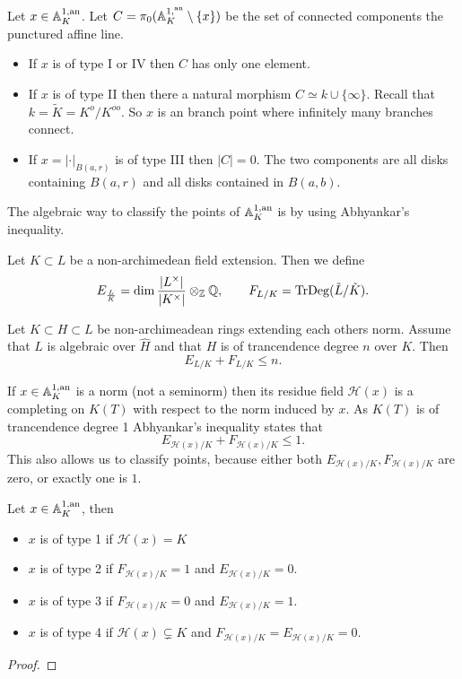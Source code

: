 \begin{proposition}
	Let $x \in \mathbb{A}_K^{1,\text{an}}$. 
	Let $C = \pi_0(\mathbb{A}_K^{1, {}^{\text{an}}}\setminus \{ x\} )$ be the set of connected components the punctured affine line. 
	\begin{itemize}
		\item If $x$ is of type I  or IV then $C$ has only one element.
		\item If $x$ is of type II then there a natural morphism $C \simeq k \cup \{\infty\} $. Recall that $k = \tilde K = K^{o} / K^{oo} $. 
			So $x$ is an branch point where infinitely many branches connect. 
		\item If $x = |\cdot |_{B(a, r)}$ is of type III then $|C| = 0$. The two components are all disks containing $B(a, r)$ and all disks contained in $B(a, b)$. 
	\end{itemize}
\end{proposition}
The algebraic way to classify the points of $\mathbb{A}_K^{1,\text{an}}$ is by using Abhyankar's inequality. 
\begin{definition}
	Let $K \subset L$ be a non-archimedean field extension. 
	Then we define \[
		E_{\frac{L}{ K}} = \dim \frac{|L^{\times }|}{|K^{\times }|} \otimes_{\mathbb{Z}} \mathbb{Q}, \qquad F_{L / K} = \operatorname{TrDeg}(\tilde L / \tilde K)
	.\] 
\end{definition}

\begin{theorem}
	Let $K \subset H \subset L$ be non-archimeadean rings extending each others norm. Assume that $L$ is algebraic over $\hat{H}$ and that $H$ is of trancendence degree $n$ over $K$. Then \[
	E_{L / K} + F_{L / K}  \le n
	.\] 
\end{theorem}

If $x \in \mathbb{A}_K^{1, \text{an}}$ is a norm (not a seminorm) then its residue field $\mathcal{H} (x)$ is a completing on $K(T)$ with respect to the norm induced by $x$. As $K(T)$ is of trancendence degree 1 Abhyankar's inequality states that \[
	E_{\mathcal{H} (x) / K} + F_{\mathcal{H} (x) / K} \le 1
.\] 
This also allows us to classify points, because either both $E_{\mathcal{H} (x) / K}, F_{\mathcal{H} (x) / K}$ are zero, or exactly one is $1$. 
\begin{proposition}
	Let $x \in \mathbb{A}_K^{1, \text{an}}$, then 
	\begin{itemize}
		\item $x$ is of type 1 if $\mathcal{H} (x) = K$
		\item $x$ is of type 2 if $F_{\mathcal{H} (x) / K} = 1$ and $E_{\mathcal{H} (x) / K} = 0$. 
		\item $x$ is of type 3 if $F_{\mathcal{H} (x) / K} = 0$ and $E_{\mathcal{H} (x) / K} = 1$.
		\item $x$ is of type 4 if $\mathcal{H} (x) \subsetneq K$ and  $F_{\mathcal{H} (x) / K} = E_{\mathcal{H} (x) / K} = 0$.
	\end{itemize}
\end{proposition}
\begin{proof}
\end{proof}


